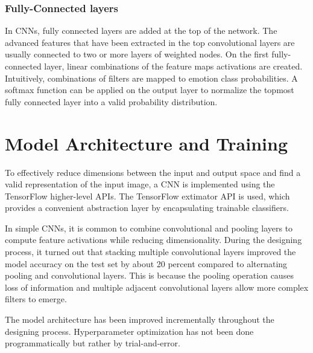 \documentclass[twoside]{article}
\begin{document}
\begin{multicols}{2}
\subsubsection{Fully-Connected layers}
In CNNs, fully connected layers are added at the top of the network. The advanced features that have been extracted in the top convolutional layers are usually connected to two or more layers of weighted nodes. On the first fully-connected layer, linear combinations of the feature maps activations are created. Intuitively, combinations of filters are mapped to emotion class probabilities. A softmax function can be applied on the output layer to normalize the topmost fully connected layer into a valid probability distribution.



\section{Model Architecture and Training}
To effectively reduce dimensions between the input and output space and find a valid representation of the input image, a CNN is implemented using the TensorFlow higher-level APIs. The TensorFlow extimator API is used, which provides a convenient abstraction layer by encapsulating trainable classifiers.

In simple CNNs, it is common to combine convolutional and pooling layers to compute feature activations while reducing dimensionality. During the designing process, it turned out that stacking multiple convolutional layers improved the model accuracy on the test set by about 20 percent compared to alternating pooling and convolutional layers. This is because the pooling operation causes loss of information and multiple adjacent convolutional layers allow more complex filters to emerge.

The model architecture has been improved incrementally throughout the designing process. Hyperparameter optimization has not been done programmatically but rather by trial-and-error.

\bigskip

\begin{tabular}{|| c ||}


\end{tabular}
\end{multicols}
\end{document}
